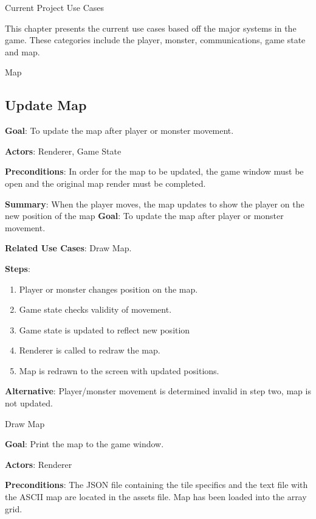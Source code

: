 \documentclass[12pt]{report}
\begin{document}
%
%

\begin{chapter}{Current Project Use Cases}

This chapter presents the current use cases based off the major systems in the game. These categories
include the player, monster, communications, game state and map.

  \begin{section}{Map}
    \subsection{Update Map}
      \textbf{Goal}: To update the map after player or monster movement.

      \textbf{Actors}:
      Renderer, Game State

      \textbf{Preconditions}: In order for the map to be updated, the game window must
      be open and the original map render must be completed.

      \textbf{Summary}: 
      When the player moves, the map updates to show the player on the new position of the map
      \textbf{Goal}: To update the map after player or monster movement.

      \textbf{Related Use Cases}: Draw Map.
	
      \textbf{Steps}: 
      \begin{enumerate}
	 \item Player or monster changes position on the map.
	 \item Game state checks validity of movement.
	 \item Game state is updated to reflect new position
      	 \item Renderer is called to redraw the map.
	 \item Map is redrawn to the screen with updated positions.
      \end{enumerate}
	
      \textbf{Alternative}: 
      Player/monster movement is determined invalid in step two, map is not updated.

    \begin{subsection}{Draw Map}

      \textbf{Goal}: 
      Print the map to the game window.

      \textbf{Actors}: 
      Renderer

      \textbf{Preconditions}: 
      The JSON file containing the tile specifics and the text file with the ASCII map are located in the assets file. Map has been loaded into the array grid.


\end{subsection}
\end{section}
\end{chapter}
\end{document}

